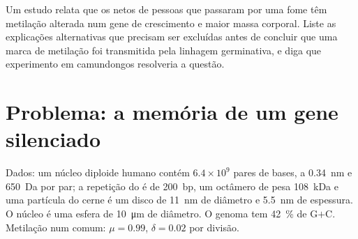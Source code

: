 \begin{exercise}[$\star\star\star$]\label{exo:b3:chromatin-epigenetics:12}
Um estudo relata que os netos de pessoas que passaram por uma fome têm
metilação alterada num gene de crescimento e maior massa corporal.
Liste as explicações alternativas que precisam ser excluídas antes de
concluir que uma marca de metilação foi transmitida pela linhagem
germinativa, e diga que experimento em camundongos resolveria a
questão.
\end{exercise}

\section{Problema: a memória de um gene silenciado}

\begin{problem}
\label{pb:b3:chromatin-epigenetics:1}
Dados: um núcleo diploide humano contém $6.4\times 10^{9}$ pares de
bases, a \qty{0.34}{nm} e \qty{650}{Da} por par; a repetição do
 é de \qty{200}{bp}, um octâmero de  pesa
\qty{108}{kDa} e uma partícula do cerne é um disco de \qty{11}{nm} de
diâmetro e \qty{5.5}{nm} de espessura. O núcleo é uma esfera de
\qty{10}{\micro m} de diâmetro. O genoma tem \qty{42}{\%} de G$+$C.
Metilação num  comum: $\mu = 0.99$, $\delta = 0.02$ por divisão.


\end{problem}
